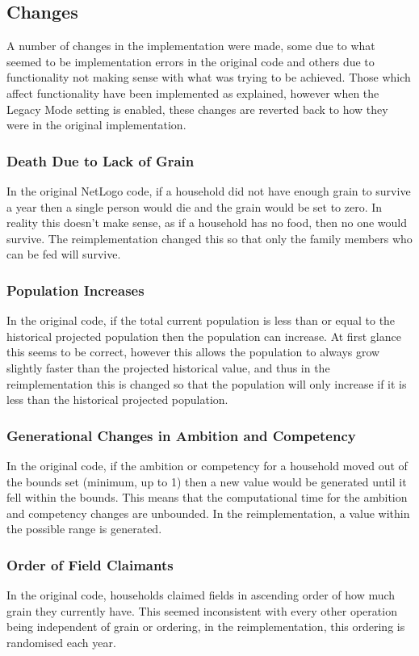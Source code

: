 \documentclass[12pt]{article}
\begin{document}
		\subsection{Changes}
			A number of changes in the implementation were made, some due to what seemed to be implementation errors in the original code and others due to functionality not making sense with what was trying to be achieved. Those which affect functionality have been implemented as explained, however when the Legacy Mode setting is enabled, these changes are reverted back to how they were in the original implementation.
				\subsubsection{Death Due to Lack of Grain}
				In the original NetLogo code, if a household did not have enough grain to survive a year then a single person would die and the grain would be set to zero. In reality this doesn't make sense, as if a household has no food, then no one would survive. The reimplementation changed this so that only the family members who can be fed will survive.\\
				\subsubsection{Population Increases}
				In the original code, if the total current population is less than or equal to the historical projected population then the population can increase. At first glance this seems to be correct, however this allows the population to always grow slightly faster than the projected historical value, and thus in the reimplementation this is changed so that the population will only increase if it is less than the historical projected population.\\
				\subsubsection{Generational Changes in Ambition and Competency}
				In the original code, if the ambition or competency for a household moved out of the bounds set (minimum, up to 1) then a new value would be generated until it fell within the bounds. This means that the computational time for the ambition and competency changes are unbounded. In the reimplementation, a value within the possible range is generated.\\
				\subsubsection{Order of Field Claimants}
				In the original code, households claimed fields in ascending order of how much grain they currently have. This seemed inconsistent with every other operation being independent of grain or ordering, in the reimplementation, this ordering is randomised each year.
\end{document}
